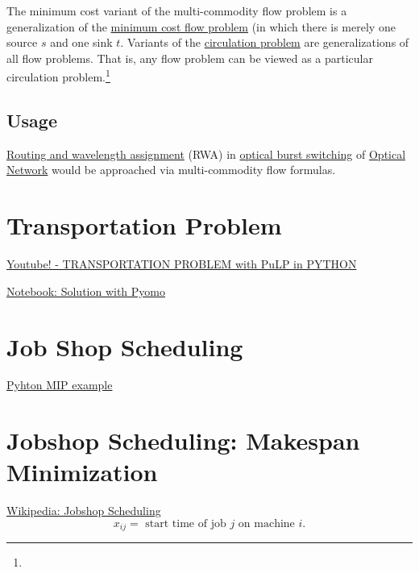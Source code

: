 {The minimum cost variant of the multi-commodity flow problem is a
generalization of the \href{minimum_cost_flow_problem}{minimum cost flow
problem} (in which there is merely one source \(s\) and one sink \(t\).
Variants of the \href{circulation_problem}{circulation problem} are
generalizations of all flow problems. That is, any flow problem can be
viewed as a particular circulation problem.\footnote{}

\hypertarget{usage}{%
\subsection{Usage}\label{usage}}

\href{Routing_and_wavelength_assignment}{Routing and wavelength
assignment} (RWA) in \href{optical_burst_switching}{optical burst
switching} of \href{SONET}{Optical Network} would be approached via
multi-commodity flow formulas.


\section{Transportation Problem}
\todoSection{}

\href{https://www.youtube.com/watch?v=Jr7LI-sUEmo}{Youtube! - TRANSPORTATION PROBLEM with PuLP in PYTHON}

\href{https://nbviewer.jupyter.org/github/Pyomo/PyomoGallery/blob/master/transport/transport.ipynb}{Notebook: Solution with Pyomo}

\section{Job Shop Scheduling}
\todoSection{}
\href{https://python-mip.readthedocs.io/en/latest/examples.html#job-shop-scheduling-problem}{Pyhton MIP example}


\section{Jobshop Scheduling: Makespan Minimization}

\href{https://en.wikipedia.org/wiki/Job_shop_scheduling}{Wikipedia: Jobshop Scheduling}
$$
x_{ij} = \text{ start time of job $j$ on machine $i$}.
$$

}
